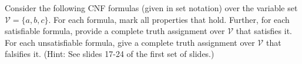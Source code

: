 \documentclass[addpoints,12pt]{exam}
\begin{document}
 

\begin{questions}

\question[10] 

\vspace*{5pt}
Consider the following CNF formulas (given in set notation) over the variable set
$\mathcal{V} = \{a,b,c\}$.
For each formula, mark all properties that hold.
Further, for each satisfiable formula, provide a complete truth assignment over $\mathcal{V}$ that
satisfies it.
For each unsatisfiable formula, give a complete truth assignment over $\mathcal{V}$ that
falsifies it. (Hint: See slides 17-24 of the first set of slides.)
\vspace*{5pt}

\end{questions}
\end{document}
